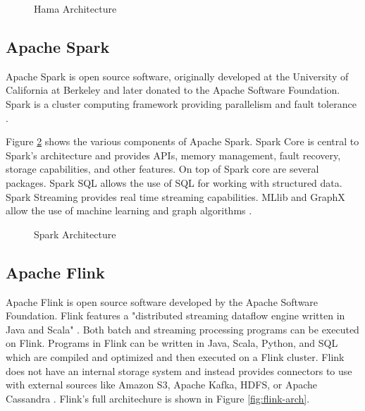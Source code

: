 \documentclass[9pt,twocolumn,twoside]{../../styles/osajnl}
\begin{document}
\begin{figure}[htbp]
\centering
{}
\caption{Hama Architecture \cite{apachehama}}
\label{fig:hama-arch}
\end{figure}






\subsection{Apache Spark}

Apache Spark is open source software, originally developed at the University of California at Berkeley and later donated to the Apache Software Foundation. Spark is a cluster computing framework providing parallelism and fault tolerance \cite{www-wikispark}.

Figure \ref{fig:spark-arch} shows the various components of Apache Spark.  Spark Core is central to Spark's architecture and provides APIs, memory management, fault recovery, storage capabilities, and other features. On top of Spark core are several packages.  Spark SQL allows the use of SQL for working with structured data.  Spark Streaming provides real time streaming capabilities.  MLlib and GraphX allow the use of machine learning and graph algorithms \cite{www-techstory}.


\begin{figure}[htbp]
\centering
{}
\caption{Spark Architecture \cite{www-techstory}}
\label{fig:spark-arch}
\end{figure}

\subsection{Apache Flink}

Apache Flink is open source software developed by the Apache Software Foundation.  Flink features a "distributed streaming dataflow engine written in Java and Scala" \cite{www-wikiflink}.  Both batch and streaming processing programs can be executed on Flink.  Programs in Flink can be written in Java, Scala, Python, and SQL which are compiled and optimized and then executed on a Flink cluster.  Flink does not have an internal storage system and instead provides connectors to use with external sources like Amazon S3, Apache Kafka, HDFS, or Apache Cassandra \cite{www-wikiflink}.  Flink's full architechure is shown in Figure \ref{fig:flink-arch}.
\end{document}
